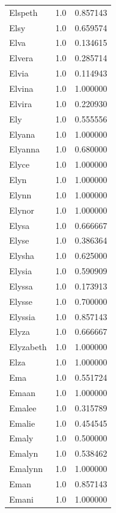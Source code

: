 \documentclass[
  letterpaper,
  DIV=11,
  numbers=noendperiod]{scrreprt}
\begin{document}
\begin{tabular}{lrr}
Elspeth         &   1.0 &   0.857143 \\
Elsy            &   1.0 &   0.659574 \\
Elva            &   1.0 &   0.134615 \\
Elvera          &   1.0 &   0.285714 \\
Elvia           &   1.0 &   0.114943 \\
Elvina          &   1.0 &   1.000000 \\
Elvira          &   1.0 &   0.220930 \\
Ely             &   1.0 &   0.555556 \\
Elyana          &   1.0 &   1.000000 \\
Elyanna         &   1.0 &   0.680000 \\
Elyce           &   1.0 &   1.000000 \\
Elyn            &   1.0 &   1.000000 \\
Elynn           &   1.0 &   1.000000 \\
Elynor          &   1.0 &   1.000000 \\
Elysa           &   1.0 &   0.666667 \\
Elyse           &   1.0 &   0.386364 \\
Elysha          &   1.0 &   0.625000 \\
Elysia          &   1.0 &   0.590909 \\
Elyssa          &   1.0 &   0.173913 \\
Elysse          &   1.0 &   0.700000 \\
Elyssia         &   1.0 &   0.857143 \\
Elyza           &   1.0 &   0.666667 \\
Elyzabeth       &   1.0 &   1.000000 \\
Elza            &   1.0 &   1.000000 \\
Ema             &   1.0 &   0.551724 \\
Emaan           &   1.0 &   1.000000 \\
Emalee          &   1.0 &   0.315789 \\
Emalie          &   1.0 &   0.454545 \\
Emaly           &   1.0 &   0.500000 \\
Emalyn          &   1.0 &   0.538462 \\
Emalynn         &   1.0 &   1.000000 \\
Eman            &   1.0 &   0.857143 \\
Emani           &   1.0 &   1.000000 \\

\end{tabular}
\end{document}
